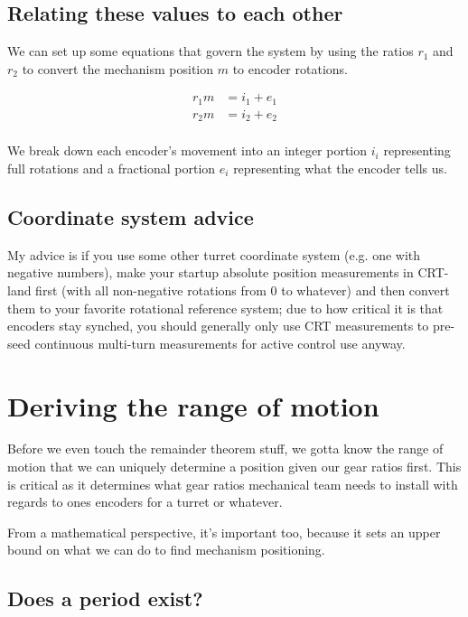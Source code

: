 \documentclass[11pt]{article}
\begin{document}
\subsection{Relating these values to each other}

We can set up some equations that govern the system by using the ratios $r_1$ and $r_2$ to convert the mechanism position $m$ to encoder rotations.

\begin{align*}
    r_1m &= i_1 + e_1\\
    r_2m &= i_2 + e_2\\
\end{align*}

We break down each encoder's movement into an integer portion $i_i$ representing full rotations and a fractional portion $e_i$ representing what the encoder tells us.

\subsection{Coordinate system advice}

My advice is if you use some other turret coordinate system (e.g. one with negative numbers), make your startup absolute position measurements in CRT-land first (with all non-negative rotations from 0 to whatever) and then convert them to your favorite rotational reference system; due to how critical it is that encoders stay synched, you should generally only use CRT measurements to pre-seed continuous multi-turn measurements for active control use anyway.

\section{Deriving the range of motion}

Before we even touch the remainder theorem stuff, we gotta know the range of motion that we can uniquely determine a position given our gear ratios first.
This is critical as it determines what gear ratios mechanical team needs to install with regards to ones encoders for a turret or whatever.

From a mathematical perspective, it's important too, because it sets an upper bound on what we can do to find mechanism positioning.

\subsection{Does a period exist?}
\end{document}

